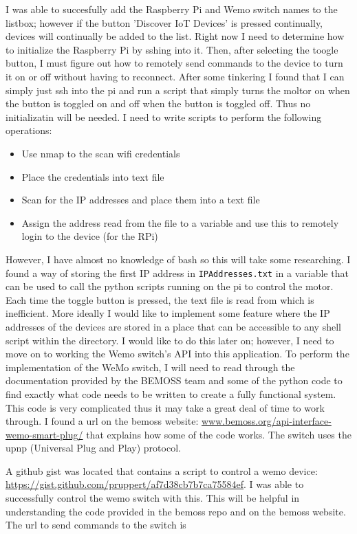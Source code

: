 \documentclass[fontsize=11pt, %
                             paper=letter, %
                             twoside, %
                             captions=tableheading,
                             index=totoc,
                             hyperref]{labbook}
\begin{document}
\begin{addmargin}[0cm]{0cm}
I was able to succesfully add the Raspberry Pi and Wemo switch names to the listbox; however if the button 'Discover IoT Devices' is pressed continually, devices will continually be added to the list. Right now I need to determine how to initialize the Raspberry Pi by sshing into it. Then, after selecting the toogle button, I must figure out how to remotely send commands to the device to turn it on or off without having to reconnect. After some tinkering I found that I can simply just ssh into the pi and run a script that simply turns the moltor on when the button is toggled on and off when the button is toggled off. Thus no initializatin will be needed. 
\bigbreak\noindent
I need to write scripts to perform the following operations:
\begin{itemize}
\item Use nmap to the scan wifi credentials
\item Place the credentials into text file
\item Scan for the IP addresses and place them into a text file
\item Assign the address read from the file to a variable and use this to remotely login to the device (for the RPi)
\end{itemize}
However, I have almost no knowledge of bash so this will take some researching. I found a way of storing the first IP address in \texttt{IPAddresses.txt} in a variable that can be used to call the python scripts running on the pi to control the motor. Each time the toggle button is pressed, the text file is read from which is inefficient. More ideally I would like to implement some feature where the IP addresses of the devices are stored in a place that can be accessible to any shell script within the directory. I would like to do this later on; however, I need to move on to working the Wemo switch's API into this application.
\bigbreak\noindent
To perform the implementation of the WeMo switch, I will need to read through the documentation provided by the BEMOSS team and some of the python code to find exactly what code needs to be written to create a fully functional system. This code is very complicated thus it may take a great deal of time to work through.
\bigbreak\noindent
I found a url on the bemoss website: \url{www.bemoss.org/api-interface-wemo-smart-plug/} that explains how some of the code works. The switch uses the upnp (Universal Plug and Play) protocol. 

A github gist was located that contains a script to control a wemo device: \url{https://gist.github.com/pruppert/af7d38cb7b7ca75584ef}. I was able to successfully control the wemo switch with this. This will be helpful in understanding the code provided in the bemoss repo and on the bemoss website. The url to send commands to the switch is


\end{addmargin}
\end{document}
